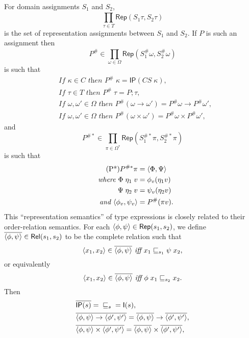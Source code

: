 \documentclass[sigplan,screen,nonacm,balance=false]{acmart}
\theoremstyle{plain}
\DeclarePairedDelimiter{\pair}{\langle}{\rangle}
\newcommand{\Rel}{\mathsf{Rel}}
\newcommand{\Id}{\mathsf{I}}
\newcommand{\Rep}{\mathsf{Rep}}
\newcommand{\IP}{\mathsf{IP}}
\newcommand{\CS}{\mathit{CS}}
\begin{document}
For domain assignments $S_1$ and $S_2$,
%
\begin{equation*}
  \prod_{\tau \in T}^{} \Rep(S_1 \tau, S_2 \tau)
\end{equation*}
%
is the set of representation assignments between $S_1$ and $S_2$.
If $P$ is such an assignment then
%
\begin{equation*}
  P^\# \in \prod_{\omega \in \Omega}^{} \Rep(S^\#_1 \omega, S^\#_2 \omega)
\end{equation*}
%
is such that
%
\begin{align*}
  \tag{P1}
  &\textit{If } \kappa \in C \textit{ then } P^\# \; \kappa = \IP(\CS \; \kappa), \\
  \tag{P2}
  &\textit{If } \tau \in T \textit{ then } P^\# \; \tau = P ; \tau,\\
  \tag{P3}
  &\textit{If } \omega, \omega' \in \Omega \textit{ then } P^\#(\omega \to \omega') = P^\# \omega \to P^\# \omega', \\
  \tag{P4}
  &\textit{If } \omega, \omega' \in \Omega \textit{ then } P^\#(\omega \times \omega') = P^\# \omega \times P^\# \omega',
\end{align*}
%
and
%
\begin{equation*}
  P^{\#*} \in \prod_{\pi \in \Omega^*} \Rep(S^{\#*}_1 \pi, S^{\#*}_2 \pi)
\end{equation*}
%
is such that
%
\begin{align*}
  \tag{P*}
  P^{\#*} \pi &= \pair{\Phi, \Psi} \\
  \textit{where } \Phi \; \eta_1 \; v &= \phi_v(\eta_1 v) \\
  \Psi \; \eta_2 \; v &= \psi_v(\eta_2 v) \\
  \textit{and } \pair{\phi_v, \psi_v} &= P^\#(\pi v).
\end{align*}
%
This ``representation semantics'' of type expressions is closely related to their order-relation semantics.
For each $\pair{\phi, \psi} \in \Rep(s_1, s_2)$, we define $\overline{\pair{\phi, \psi}} \in \Rel(s_1, s_2)$ to be the complete relation such that
%
\begin{equation*}
  \pair{x_1, x_2} \in \overline{\pair{\phi, \psi}} \textit{ iff } x_1 \sqsubseteq_{s_1} \psi \; x_2,
\end{equation*}
%
or equivalently
%
\begin{equation*}
  \pair{x_1, x_2} \in \overline{\pair{\phi, \psi}} \textit{ iff } \phi \; x_1 \sqsubseteq_{s_2} x_2.
\end{equation*}
%
Then
%
\begin{align*}
  & \overline{\IP(s)} = {} \sqsubseteq_s {} = \Id(s), \\
  & \overline{\pair{\phi, \psi} \to \pair{\phi', \psi'}} = \overline{\pair{\phi, \psi}} \to \overline{\pair{\phi', \psi'}}, \\
  & \overline{\pair{\phi, \psi} \times \pair{\phi', \psi'}} = \overline{\pair{\phi, \psi}} \times \overline{\pair{\phi', \psi'}}, \\
\end{align*}
\end{document}
